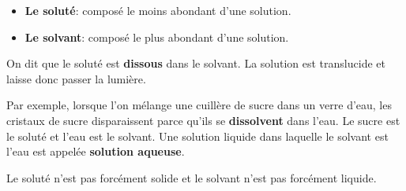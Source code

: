 \documentclass[
  11pt,
  a4paper,
  openany]{book}
\providecommand{\tightlist}{%
  \setlength{\itemsep}{0pt}\setlength{\parskip}{0pt}}
\begin{document}
\begin{itemize}
\tightlist
\item
  \textbf{Le soluté}: composé le moins abondant d'une solution.
\item
  \textbf{Le solvant}: composé le plus abondant d'une solution.
\end{itemize}

On dit que le soluté est \textbf{dissous} dans le solvant. La solution est translucide et laisse donc passer la lumière.

Par exemple, lorsque l'on mélange une cuillère de sucre dans un verre d'eau, les cristaux de sucre disparaissent parce qu'ils se \textbf{dissolvent} dans l'eau. Le sucre est le soluté et l'eau est le solvant. Une solution liquide dans laquelle le solvant est l'eau est appelée \textbf{solution aqueuse}.

Le soluté n'est pas forcément solide et le solvant n'est pas forcément liquide.

\newpage
\end{document}
